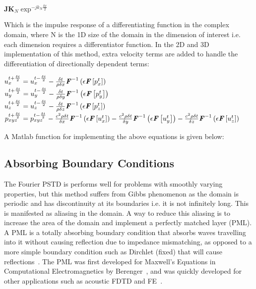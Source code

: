 \begin{center}
$\textbf{JK}_N \exp^{-jk_N\frac{\delta x}{2}}$\\
\end{center}
Which is the impulse response of a differentiating function in the complex domain, where N is the 1D size of the domain in the dimension of interest i.e. each dimension requires a differentiator function. In the 2D and 3D implementation of this method, extra velocity terms are added to handle the differentiation of directionally dependent terms:\\
\begin{center}
$u^{t + \frac{\delta t}{2}}_{x} = u^{t - \frac{\delta t}{2}}_{x} - \frac{\delta t}{\rho \delta x} \textbf{\textit{F}}^{-1}\left(\epsilon \textbf{\textit{F}}\left[p^{t}_{x}\right] \right)$\\
$u^{t + \frac{\delta t}{2}}_{y} = u^{t - \frac{\delta t}{2}}_{y} - \frac{\delta t}{\rho \delta y} \textbf{\textit{F}}^{-1}\left(\epsilon \textbf{\textit{F}}\left[p^{t}_{y}\right] \right)$\\
$u^{t + \frac{\delta t}{2}}_{z} = u^{t - \frac{\delta t}{2}}_{z} - \frac{\delta t}{\rho \delta z} \textbf{\textit{F}}^{-1}\left(\epsilon \textbf{\textit{F}}\left[p^{t}_{z}\right] \right)$\\
$p^{t + \frac{\delta t}{2}}_{xyz} = p^{t - \frac{\delta t}{2}}_{xyz} - \frac{c^2 \rho \delta t}{\delta x} \textbf{\textit{F}}^{-1}\left( \epsilon \textbf{\textit{F}} \left[ u_x^{t} \right] \right) - \frac{c^2 \rho \delta t}{\delta y} \textbf{\textit{F}}^{-1}\left( \epsilon \textbf{\textit{F}} \left[ u_y^{t} \right] \right) - \frac{c^2 \rho \delta t}{\delta z} \textbf{\textit{F}}^{-1}\left( \epsilon \textbf{\textit{F}} \left[ u_z^{t} \right] \right)$ \\
\end{center}
A Matlab function for implementing the above equations is given below:\\

%

\subsection{Absorbing Boundary Conditions}
The Fourier PSTD is performs well for problems with smoothly varying properties, but this method suffers from Gibbs phenomenon as the domain is periodic and has discontinuity at its boundaries i.e. it is not infinitely long. This is manifested as aliasing in the domain. A way to reduce this aliasing is to increase the area of the domain and implement a perfectly matched layer (PML). A PML is a totally absorbing boundary condition that absorbs waves travelling into it without causing reflection due to impedance mismatching, as opposed to a more simple boundary condition such as Dirchlet (fixed) that will cause reflections~\cite{Rumpf2012a}. The PML was first developed for Maxwell's Equations in Computational Electromagnetics by Berenger~\cite{Berenger1994}, and was quickly developed for other applications such as acoustic FDTD and FE~\cite{Liu1997}.\\

